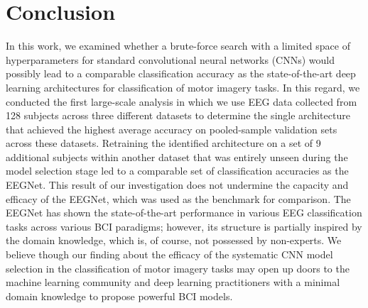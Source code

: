 \documentclass{ieeeaccess}
\begin{document}
{    
    \section{Conclusion}
    \label{sec:conclusion}
    In this work, we examined whether a brute-force search with a limited space of hyperparameters for standard convolutional neural networks (CNNs) would possibly lead to a comparable classification accuracy as the state-of-the-art deep learning architectures for classification of motor imagery tasks. In this regard, we conducted the first large-scale analysis in which we use EEG data collected from 128 subjects across three different datasets to determine the single architecture that achieved the highest average accuracy on pooled-sample validation sets across these datasets. Retraining the identified architecture on a set of 9 additional subjects within another dataset that was entirely unseen during the model selection stage led to a comparable set of classification accuracies as the EEGNet. This result of our investigation does not undermine the capacity and efficacy of the EEGNet, which was used as the benchmark for comparison. The EEGNet has shown the state-of-the-art performance in various EEG classification tasks across various BCI paradigms; however, its structure is partially inspired by the domain knowledge, which is, of course, not possessed by non-experts. We believe though our finding about the efficacy of the systematic CNN model selection in the classification of motor imagery tasks may open up doors to the machine learning community and deep learning practitioners with a minimal domain knowledge to propose powerful BCI models. 
           
    
      
    
}
\end{document}
